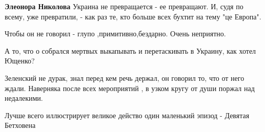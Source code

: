 \begin{itemize}
\begin{itemize}
 
\textbf{Элеонора Николова} Украина не превращается - ее превращают. И, судя по всему, уже превратили, - как раз те, кто больше всех бухтит на тему "це Европа".
\end{itemize}

 
Чтобы он не говорил - глупо ,примитивно,бездарно. Очень неприятно.

 
А то, что о собрался мертвых выкапывать и перетаскивать в Украину, как хотел Ющенко?

 

Зеленский не дурак, знал перед кем речь держал, он говорил то, что от него
ждали. Наверняка после всех мероприятий , в узком кругу от души поржал над
недалекими.


 
Лучше всего иллюстрирует великое действо один маленький эпизод - Девятая Бетховена

 

\end{itemize}
